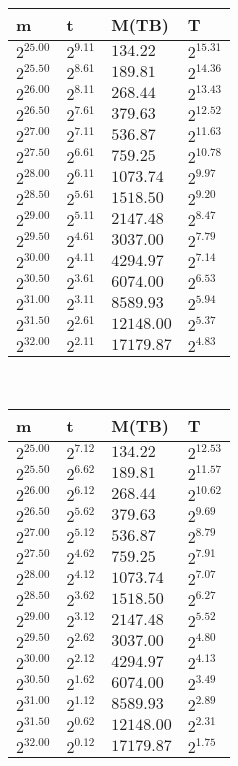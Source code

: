 \begin{tabular}{llll}
m & t & M(TB) & T \\ \hline
$2^{25.00}$ & $2^{9.11}$ & $134.22$ & $2^{15.31}$ \\
$2^{25.50}$ & $2^{8.61}$ & $189.81$ & $2^{14.36}$ \\
$2^{26.00}$ & $2^{8.11}$ & $268.44$ & $2^{13.43}$ \\
$2^{26.50}$ & $2^{7.61}$ & $379.63$ & $2^{12.52}$ \\
$2^{27.00}$ & $2^{7.11}$ & $536.87$ & $2^{11.63}$ \\
$2^{27.50}$ & $2^{6.61}$ & $759.25$ & $2^{10.78}$ \\
$2^{28.00}$ & $2^{6.11}$ & $1073.74$ & $2^{9.97}$ \\
$2^{28.50}$ & $2^{5.61}$ & $1518.50$ & $2^{9.20}$ \\
$2^{29.00}$ & $2^{5.11}$ & $2147.48$ & $2^{8.47}$ \\
$2^{29.50}$ & $2^{4.61}$ & $3037.00$ & $2^{7.79}$ \\
$2^{30.00}$ & $2^{4.11}$ & $4294.97$ & $2^{7.14}$ \\
$2^{30.50}$ & $2^{3.61}$ & $6074.00$ & $2^{6.53}$ \\
$2^{31.00}$ & $2^{3.11}$ & $8589.93$ & $2^{5.94}$ \\
$2^{31.50}$ & $2^{2.61}$ & $12148.00$ & $2^{5.37}$ \\
$2^{32.00}$ & $2^{2.11}$ & $17179.87$ & $2^{4.83}$ \\
\end{tabular}
 \ 
\begin{tabular}{llll}
m & t & M(TB) & T \\ \hline
$2^{25.00}$ & $2^{7.12}$ & $134.22$ & $2^{12.53}$ \\
$2^{25.50}$ & $2^{6.62}$ & $189.81$ & $2^{11.57}$ \\
$2^{26.00}$ & $2^{6.12}$ & $268.44$ & $2^{10.62}$ \\
$2^{26.50}$ & $2^{5.62}$ & $379.63$ & $2^{9.69}$ \\
$2^{27.00}$ & $2^{5.12}$ & $536.87$ & $2^{8.79}$ \\
$2^{27.50}$ & $2^{4.62}$ & $759.25$ & $2^{7.91}$ \\
$2^{28.00}$ & $2^{4.12}$ & $1073.74$ & $2^{7.07}$ \\
$2^{28.50}$ & $2^{3.62}$ & $1518.50$ & $2^{6.27}$ \\
$2^{29.00}$ & $2^{3.12}$ & $2147.48$ & $2^{5.52}$ \\
$2^{29.50}$ & $2^{2.62}$ & $3037.00$ & $2^{4.80}$ \\
$2^{30.00}$ & $2^{2.12}$ & $4294.97$ & $2^{4.13}$ \\
$2^{30.50}$ & $2^{1.62}$ & $6074.00$ & $2^{3.49}$ \\
$2^{31.00}$ & $2^{1.12}$ & $8589.93$ & $2^{2.89}$ \\
$2^{31.50}$ & $2^{0.62}$ & $12148.00$ & $2^{2.31}$ \\
$2^{32.00}$ & $2^{0.12}$ & $17179.87$ & $2^{1.75}$ \\
\end{tabular}
